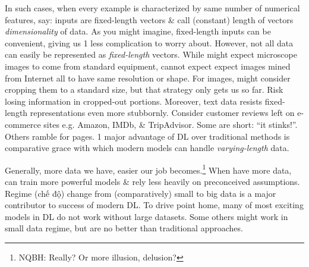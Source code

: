 \documentclass{article}
\begin{document}
\begin{enumerate}
\begin{itemize}
\begin{itemize}
\begin{itemize}
				In such cases, when every example is characterized by same number of numerical features, say: inputs are fixed-length vectors \& call (constant) length of vectors {\it dimensionality} of data. As you might imagine, fixed-length inputs can be convenient, giving us 1 less complication to worry about. However, not all data can easily be represented as {\it fixed-length} vectors. While might expect microscope images to come from standard equipment, cannot expect expect images mined from Internet all to have same resolution or shape. For images, might consider cropping them to a standard size, but that strategy only gets us so far. Risk losing information in cropped-out portions. Moreover, text data resists fixed-length representations even more stubbornly. Consider customer reviews left on e-commerce sites e.g. Amazon, IMDb, \& TripAdvisor. Some are short: ``it stinks!''. Others ramble for pages. 1 major advantage of DL over traditional methods is comparative grace with which modern models can handle {\it varying-length} data.
				
				Generally, more data we have, easier our job becomes.\footnote{NQBH: Really? Or more illusion, delusion?} When have more data, can train more powerful models \& rely less heavily on preconceived assumptions. Regime (chế độ) change from (comparatively) small to big data is a major contributor to success of modern DL. To drive point home, many of most exciting models in DL do not work without large datasets. Some others might work in small data regime, but are no better than traditional approaches.
				

\end{itemize}
\end{itemize}
\end{itemize}
\end{enumerate}
\end{document}
